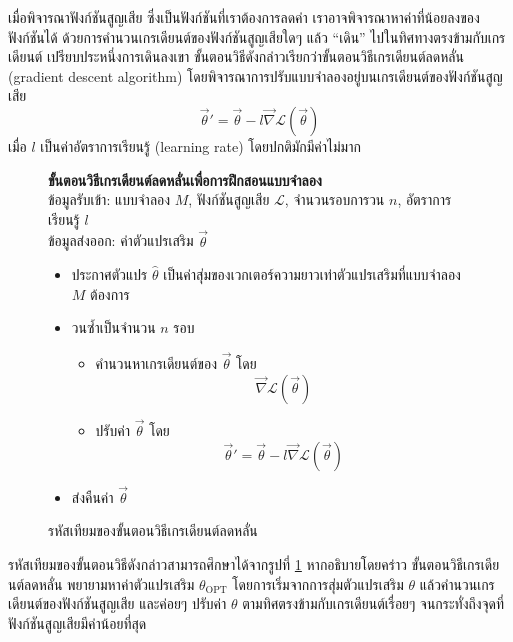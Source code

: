 \documentclass{cpereport}
\begin{document}
เมื่อพิจารณาฟังก์ชันสูญเสีย ซึ่งเป็นฟังก์ชันที่เราต้องการลดค่า เราอาจพิจารณาหาค่าที่น้อยลงของฟังก์ชันได้ ด้วยการคำนวนเกรเดียนต์ของฟังก์ชันสูญเสียใดๆ แล้ว ``เดิน''  ไปในทิศทางตรงข้ามกับเกรเดียนต์ เปรียบประหนึ่งการเดินลงเขา ขั้นตอนวิธีดังกล่าวเรียกว่าขั้นตอนวิธีเกรเดียนต์ลดหลั่น (gradient descent algorithm) โดยพิจารณาการปรับแบบจำลองอยู่บนเกรเดียนต์ของฟังก์ชันสูญเสีย
\begin{equation}
    \vec{\theta}' = \vec{\theta} - l \vec{\nabla}{\mathscr{L}(\vec{\theta})}
    \label{gradient-descent}
\end{equation}
เมื่อ $l$ เป็นค่าอัตราการเรียนรู้ (learning rate) โดยปกติมักมีค่าไม่มาก

\begin{figure}
    \begin{info-box}
        \textbf{ขั้นตอนวิธีเกรเดียนต์ลดหลั่นเพื่อการฝึกสอนแบบจำลอง}\\
        ข้อมูลรับเข้า: แบบจำลอง $M$, ฟังก์ชันสูญเสีย $\mathscr{L}$, จำนวนรอบการวน $n$, อัตราการเรียนรู้ $l$\\
        ข้อมูลส่งออก: ค่าตัวแปรเสริม $\vec{\theta}$

        \begin{itemize}[noitemsep]
            \item ประกาศตัวแปร $\hat{\theta}$ เป็นค่าสุ่มของเวกเตอร์ความยาวเท่าตัวแปรเสริมที่แบบจำลอง $M$ ต้องการ
            \item วนซ้ำเป็นจำนวน $n$ รอบ
            \begin{itemize}[noitemsep]
                \item คำนวนหาเกรเดียนต์ของ $\vec{\theta}$ โดย 
                $$
                    \vec{\nabla}{\mathscr{L}(\vec{\theta})}
                $$
                \item ปรับค่า $\vec{\theta}$ โดย
                $$
                    \vec{\theta}' = \vec{\theta} - l \vec{\nabla}{\mathscr{L}(\vec{\theta})}
                $$
                \end{itemize}
            \item ส่งคืนค่า $\vec{\theta}$
        \end{itemize}
    \end{info-box}
    \caption{รหัสเทียมของขั้นตอนวิธีเกรเดียนต์ลดหลั่น}
    \label{gradient-descent-pseudocode}
\end{figure}

รหัสเทียมของขั้นตอนวิธีดังกล่าวสามารถศึกษาได้จากรูปที่ \ref{gradient-descent-pseudocode} หากอธิบายโดยคร่าว ขั้นตอนวิธีเกรเดียนต์ลดหลั่น พยายามหาค่าตัวแปรเสริม $\theta_{\textrm{OPT}}$ โดยการเริ่มจากการสุ่มตัวแปรเสริม $\theta$ แล้วคำนวนเกรเดียนต์ของฟังก์ชันสูญเสีย และค่อยๆ ปรับค่า $\theta$ ตามทิศตรงข้ามกับเกรเดียนต์เรื่อยๆ จนกระทั่งถึงจุดที่ฟังก์ชันสูญเสียมีค่าน้อยที่สุด
\end{document}
